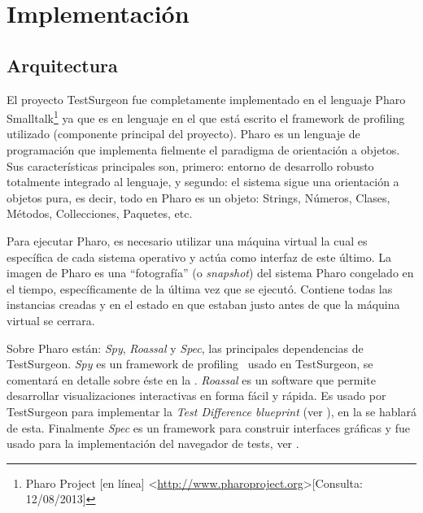 \chapter{Implementación}

\section{Arquitectura}

\par El proyecto TestSurgeon fue completamente implementado en el lenguaje Pharo Smalltalk\footnote{Pharo Project [en línea] \textless\url{http://www.pharoproject.org}\textgreater  [Consulta: 12/08/2013] } ya que es en lenguaje en el que está escrito el framework de profiling utilizado (componente principal del proyecto). Pharo es un lenguaje de programación que implementa fielmente el paradigma de orientación a objetos. Sus características principales son, primero: entorno de desarrollo robusto totalmente integrado al lenguaje, y segundo: el sistema sigue una orientación a objetos pura, es decir, todo en Pharo es un objeto: Strings, Números, Clases, Métodos, Collecciones, Paquetes, etc. 

\par Para ejecutar Pharo, es necesario utilizar una máquina virtual la cual es específica de cada sistema operativo y actúa como interfaz de este último. La imagen de Pharo es una ``fotografía'' (o {\it snapshot}) del sistema Pharo congelado en el tiempo, específicamente de la última vez que se ejecutó. Contiene todas las instancias creadas y en el estado en que estaban justo antes de que la máquina virtual se cerrara.

\par Sobre Pharo están: \emph{Spy}, \emph{Roassal} y \emph{Spec}, las principales dependencias de TestSurgeon. \emph{Spy} es un framework de profiling~\cite{Berg11h} usado en TestSurgeon, se comentará en detalle sobre éste en la . \emph{Roassal} es un software que permite desarrollar visualizaciones interactivas en forma fácil y rápida. Es usado por TestSurgeon para implementar la \emph{Test Difference blueprint} (ver ), en la  se hablará de esta. Finalmente \emph{Spec} es un framework para construir interfaces gráficas y fue usado para la implementación del navegador de tests, ver .



